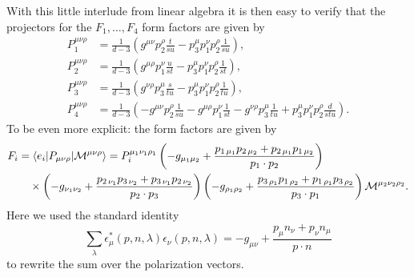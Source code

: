 With this little interlude from linear algebra it is then easy to verify that the projectors for the $F_1,\ldots , F_4$ form factors are given by
\begin{equation}
\begin{split}
P_1^{\mu \nu \rho} &= \frac{1}{d - 3} \left( g^{\mu \nu} p_2^\rho \frac{t}{su} - p_3^\mu p_1^\nu p_2^\rho \frac{1}{su} \right), \\
P_2^{\mu \nu \rho} &= \frac{1}{d - 3} \left( g^{\mu \rho} p_1^\nu \frac{u}{s t} - p_3^\mu p_1^\nu p_2^\rho \frac{1}{st} \right), \\
P_3^{\mu \nu \rho} &= \frac{1}{d - 3} \left( g^{\nu \rho} p_3^\mu \frac{s}{t u} - p_3^\mu p_1^\nu p_2^\rho \frac{1}{t u} \right), \\
P_4^{\mu \nu \rho} &= \frac{1}{d - 3} \left( - g^{\mu \nu} p_2^\rho \frac{1}{s u} - g^{\mu \rho} p_1^\nu \frac{1}{s t} - g^{\nu \rho} p_3^\mu \frac{1}{t u} + p_3^\mu p_1^\nu p_2^\rho \frac{d}{s t u} \right).
\end{split}
\end{equation}
To be even more explicit: the form factors are given by
\begin{equation}
\begin{split}
&F_i = \braket{e_i| P_{\mu \nu \rho} | \mathcal{M}^{\mu \nu \rho}} = P_i^{\mu_1 \nu_1 \rho_1} \left(-g_{\mu_1 \mu_2} + \frac{p_{1\, \mu_1} p_{2\, \mu_2} + p_{2\, \mu_1} p_{1\, \mu_2}}{p_1 \cdot p_2} \right) \\
& \qquad \times \left(-g_{\nu_1 \nu_2} + \frac{p_{2\, \nu_1} p_{3\, \nu_2} + p_{3\, \nu_1} p_{2\, \nu_2}}{p_2 \cdot p_3} \right) \left(-g_{\rho_1 \rho_2} + \frac{p_{3\, \rho_1} p_{1\, \rho_2} + p_{1\, \rho_1} p_{3\, \rho_2}}{p_3 \cdot p_1} \right) \mathcal{M}^{\mu_2 \nu_2 \rho_2}.
\end{split}
\end{equation}
Here we used the standard identity
\begin{equation}
\sum_{\lambda} \epsilon^{*}_\mu (p, n, \lambda) \epsilon_\nu(p, n, \lambda) = -g_{\mu \nu} + \frac{p_\mu n_\nu + p_\nu n_\mu}{p \cdot n}
\end{equation}
to rewrite the sum over the polarization vectors.

